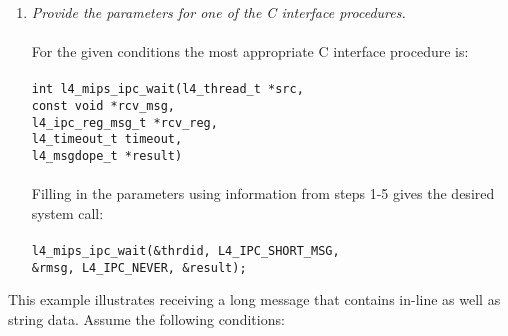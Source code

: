\begin{enumerate}
\item \emph{Provide the parameters for one of the C interface 
    procedures.} \\ \\ \hspace*{10pt}
  For the given conditions the most appropriate C interface procedure 
  is:\\ \\
  \hspace*{20pt} {\footnotesize\verb+int l4_mips_ipc_wait(l4_thread_t *src,+} \\ 
  \hspace*{130pt} {\footnotesize\verb+const void *rcv_msg,+} \\
  \hspace*{130pt} {\footnotesize\verb+l4_ipc_reg_msg_t *rcv_reg,+}\\ 
  \hspace*{130pt} {\footnotesize\verb+l4_timeout_t timeout,+}\\ 
  \hspace*{130pt} {\footnotesize\verb+l4_msgdope_t *result)+}\\ \\
  \hspace*{10pt} Filling in the parameters using information from steps
  1-5 gives the desired system call: \\ \\
  \hspace*{20pt} {\footnotesize\verb+l4_mips_ipc_wait(&thrdid, L4_IPC_SHORT_MSG,+}\\
  \hspace*{140pt} {\footnotesize\verb+&rmsg, L4_IPC_NEVER, &result);+}
  
\end{enumerate}  


This example illustrates receiving a long message that contains
in-line as well as string data. Assume the following conditions:

